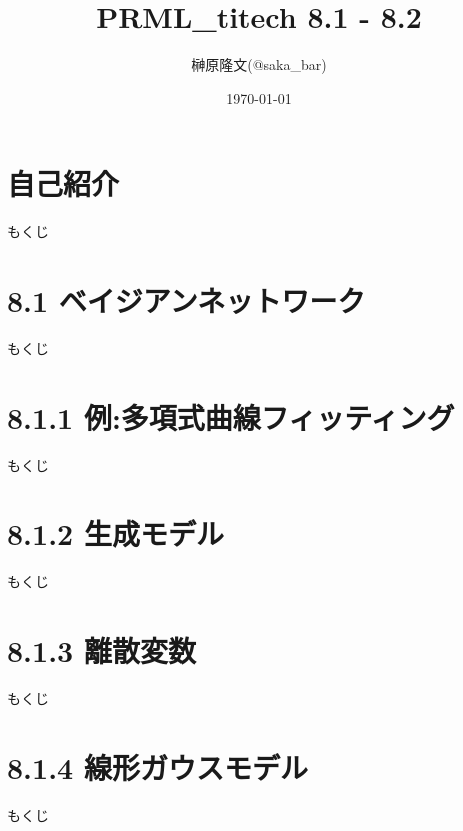 \documentclass[dvipdfm, t]{beamer}
\title{PRML\_titech 8.1 - 8.2}
\author{榊原隆文(@saka\_bar)}
\date{\today}
\begin{document}
\maketitle

 \section*{自己紹介}
 

 \begin{frame}{もくじ}
  \tableofcontents
 \end{frame}

 \section{8.1 ベイジアンネットワーク}
 \begin{frame}{もくじ}
  \tableofcontents[currentsection]
 \end{frame}
 

 \section{8.1.1 例:多項式曲線フィッティング}
 \begin{frame}{もくじ}
  \tableofcontents[currentsection]
 \end{frame}
 

 \section{8.1.2 生成モデル}
 \begin{frame}{もくじ}
  \tableofcontents[currentsection]
 \end{frame}
 

 \section{8.1.3 離散変数}
 \begin{frame}{もくじ}
  \tableofcontents[currentsection]
 \end{frame}
 

 \section{8.1.4 線形ガウスモデル}
 \begin{frame}{もくじ}
  \tableofcontents[currentsection]
 \end{frame}
 
\end{document}
